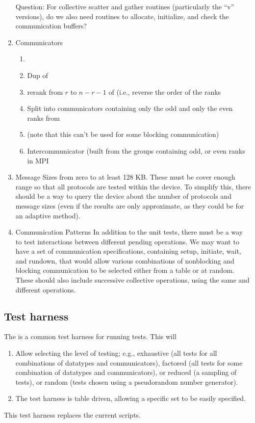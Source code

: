\documentclass{article}
\begin{document}
\begin{enumerate}
     Question:  For collective scatter and gather routines
     (particularly the ``v'' versions), do we also need routines to
     allocate, initialize, and check the communication buffers?

\item Communicators
    \begin{enumerate}
    \item {}
    \item Dup of 
    \item rerank from $r$ to $n-r-1$ of  (i.e.,
    reverse the order of the ranks
    \item Split into communicators containing only the odd and only
    the even ranks from 
    \item {} (note that this can't be used for some
    blocking communication)
    \item Intercommunicator (built from the groups containing odd,
or even ranks in MPI 
    \end{enumerate}

\item Message Sizes from zero to at least 128 KB.  These must be cover
enough range so that all protocols are tested within the device.  To
simplify this, there should be a way to query the device about the
number of protocols and message sizes (even if the results are only
approximate, as they could be for an adaptive method).

\item Communication Patterns
In addition to the unit tests, there must be a way to test
interactions between different pending operations.  We may want to
have a set of communication specifications, containing setup,
initiate, wait, and rundown, that would allow various combinations of
nonblocking and blocking communication to be selected either from a
table or at random.  These should also include successive collective
operations, using the same and different operations.

\end{enumerate}

\subsection{Test harness}
The is a common test harness for running tests.  This will
\begin{enumerate}
\item Allow selecting the level of testing; e.g., exhaustive (all
tests for all combinations of datatypes and communicators), factored
(all tests for some combination of datatypes and communicators), or
reduced (a sampling of tests), or random (tests chosen using a
pseudorandom number generator).  

\item The test harness is table driven, allowing a specific set to be
easily specified.  
\end{enumerate}
This test harness replaces the current  scripts.
\end{document}
